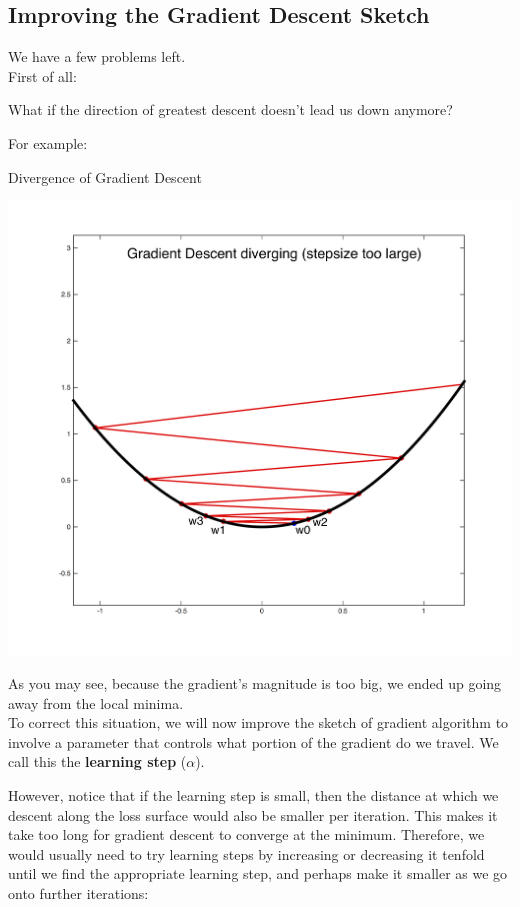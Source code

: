 \subsection{Improving the Gradient Descent Sketch}
We have a few problems left. \\
First of all:
\begin{center}
    What if the direction of greatest descent doesn't lead us down anymore?
\end{center}
For example:
\begin{ln-fig}[sidebyside]{Divergence of Gradient Descent}{}
    \begin{center}
        \includegraphics[scale=0.25]{figs/ln04/grad-descent-diverge.png}
    \end{center}
    \tcblower
    As you may see, because the gradient's magnitude is too big, we ended up going away from the local minima. \\
    To correct this situation, we will now improve the sketch of gradient algorithm to involve a parameter that controls what portion of the gradient do we travel. We call this the \textbf{learning step} ($\alpha$).
\end{ln-fig}
However, notice that if the learning step is small, then the distance at which we descent along the loss surface would also be smaller per iteration. This makes it take too long for gradient descent to converge at the minimum. 
Therefore, we would usually need to try learning steps by increasing or decreasing it tenfold until we find the appropriate learning step, and perhaps make it smaller as we go onto further iterations:
